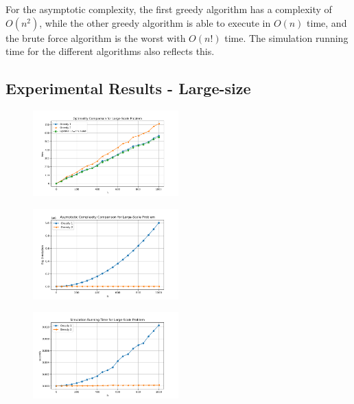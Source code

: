\documentclass[11pt]{article}
\begin{document}
\begin{multicols}{2}
	For the asymptotic complexity, the first greedy algorithm has a complexity of ${O(n^2)}$, while the
	other greedy algorithm is able to execute in ${O({n})}$ time, and the brute force algorithm is the
	worst with ${O(n!)}$ time. The simulation running time for the different algorithms also reflects
	this.

	\subsection{Experimental Results - Large-size}
	\begin{figure}[H]
		\centering
		\includegraphics[width=0.5\textwidth]{images/largescale_optimality.png}
	\end{figure}
	\begin{figure}[H]
		\centering
		\includegraphics[width=0.5\textwidth]{images/largescale_complexity.png}
	\end{figure}
	\begin{figure}[H]
		\centering
		\includegraphics[width=0.5\textwidth]{images/largescale_simtime.png}
	\end{figure}


\end{multicols}
\end{document}
